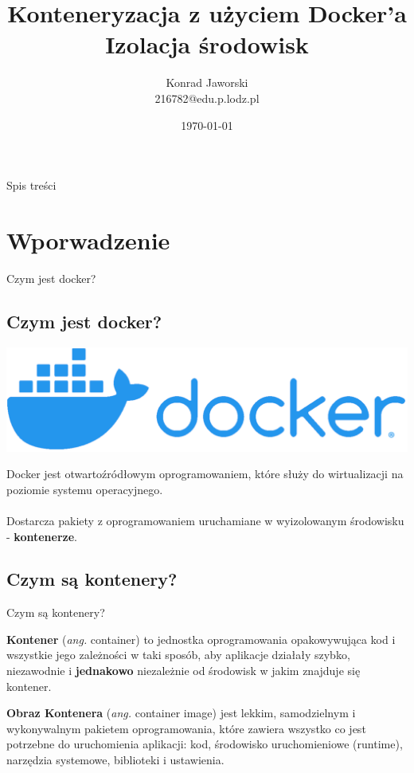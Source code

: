 \documentclass[aspectratio=169]{beamer}
\title{Konteneryzacja z użyciem \textbf{Docker}'a \\Izolacja środowisk}
\date{\today}
\author[Jaworski]{Konrad Jaworski\\216782@edu.p.lodz.pl}
\begin{document}
\begin{frame}
    \titlepage
\end{frame}

\begin{frame}{Spis treści}
    \begin{card}
        \tableofcontents
    \end{card}
\end{frame}

\section{Wporwadzenie}
\begin{frame}{Czym jest docker?}\subsection{Czym jest docker?}

    \centering
    \includegraphics[scale=0.2]{img/logo.png}
    \bigskip

    \begin{card}
        Docker jest otwartoźródłowym oprogramowaniem, które służy do wirtualizacji na poziomie systemu operacyjnego.\\\\
        Dostarcza pakiety z oprogramowaniem uruchamiane w wyizolowanym środowisku - \textbf{kontenerze}.
    \end{card}
\end{frame}




\subsection{Czym są kontenery?}
\begin{frame}{Czym są kontenery?}
    \begin{card}
        \textbf{Kontener} (\textit{ang.} container) to jednostka oprogramowania opakowywująca kod i wszystkie jego zależności w taki sposób, aby aplikacje działały szybko, niezawodnie i \textbf{jednakowo} niezależnie od środowisk w jakim znajduje się kontener.
    \end{card}

    \begin{card}
        \textbf{Obraz Kontenera} (\textit{ang.} container image) jest lekkim, samodzielnym i wykonywalnym pakietem oprogramowania, które zawiera wszystko co jest potrzebne do uruchomienia aplikacji: kod,
        środowisko uruchomieniowe (runtime), narzędzia systemowe, biblioteki i ustawienia.
    \end{card}
\end{frame}
\end{document}
